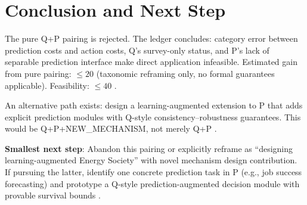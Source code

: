 \documentclass{article}
\begin{document}
\section*{Conclusion and Next Step}

The pure Q+P pairing is rejected. The ledger concludes: category error between prediction costs and action costs, Q's survey-only status, and P's lack of separable prediction interface make direct application infeasible. Estimated gain from pure pairing: \(\leq 20\) (taxonomic reframing only, no formal guarantees applicable). Feasibility: \(\leq 40\) .

An alternative path exists: design a learning-augmented extension to P that adds explicit prediction modules with Q-style consistency--robustness guarantees. This would be Q+P+NEW\_MECHANISM, not merely Q+P .

\textbf{Smallest next step}: Abandon this pairing or explicitly reframe as ``designing learning-augmented Energy Society'' with novel mechanism design contribution. If pursuing the latter, identify one concrete prediction task in P (e.g., job success forecasting) and prototype a Q-style prediction-augmented decision module with provable survival bounds .
\end{document}

